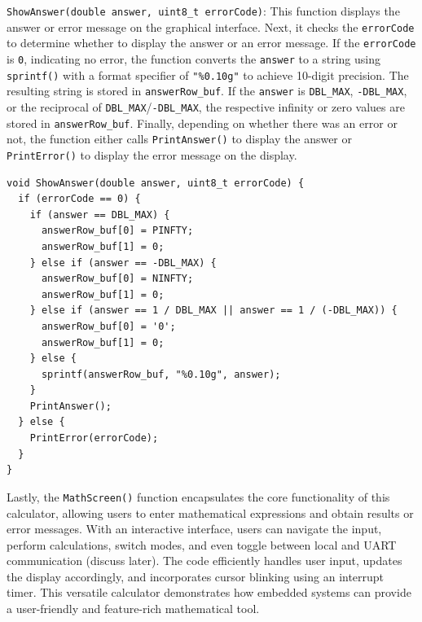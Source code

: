 \documentclass[a4paper, twoside]{report}
\begin{document}
\texttt{ShowAnswer(double answer, uint8_t errorCode)}: This function displays the answer or error message on the graphical interface. Next, it checks the \texttt{errorCode} to determine whether to display the answer or an error message. If the \texttt{errorCode} is \texttt{0}, indicating no error, the function converts the \texttt{answer} to a string using \texttt{sprintf()} with a format specifier of \texttt{"\%0.10g"} to achieve 10-digit precision. The resulting string is stored in \texttt{answerRow_buf}. If the \texttt{answer} is \texttt{DBL_MAX}, \texttt{-DBL_MAX}, or the reciprocal of \texttt{DBL_MAX}/\texttt{-DBL_MAX}, the respective infinity or zero values are stored in \texttt{answerRow_buf}. Finally, depending on whether there was an error or not, the function either calls \texttt{PrintAnswer()} to display the answer or \texttt{PrintError()} to display the error message on the display.
\begin{verbatim}
void ShowAnswer(double answer, uint8_t errorCode) {
  if (errorCode == 0) {
    if (answer == DBL_MAX) {
      answerRow_buf[0] = PINFTY;
      answerRow_buf[1] = 0;
    } else if (answer == -DBL_MAX) {
      answerRow_buf[0] = NINFTY;
      answerRow_buf[1] = 0;
    } else if (answer == 1 / DBL_MAX || answer == 1 / (-DBL_MAX)) {
      answerRow_buf[0] = '0';
      answerRow_buf[1] = 0;
    } else {
      sprintf(answerRow_buf, "%0.10g", answer);
    }
    PrintAnswer();
  } else {
    PrintError(errorCode);
  }
}
\end{verbatim}

Lastly, the \texttt{MathScreen()} function encapsulates the core functionality of this calculator, allowing users to enter mathematical expressions and obtain results or error messages. With an interactive interface, users can navigate the input, perform calculations, switch modes, and even toggle between local and UART communication (discuss later). The code efficiently handles user input, updates the display accordingly, and incorporates cursor blinking using an interrupt timer. This versatile calculator demonstrates how embedded systems can provide a user-friendly and feature-rich mathematical tool.
 
\end{document}
